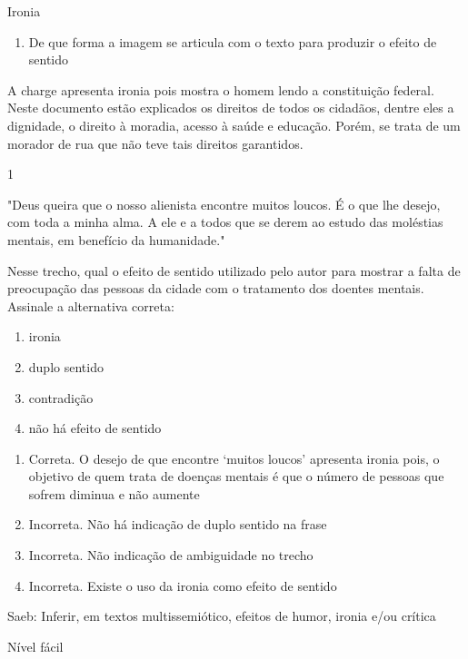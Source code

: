 {Ironia

\begin{enumerate}
\def\labelenumi{\arabic{enumi})}
\setcounter{enumi}{9}
\tightlist
\item
  De que forma a imagem se articula com o texto para produzir o efeito
  de sentido
\end{enumerate}

A charge apresenta ironia pois mostra o homem lendo a constituição
federal. Neste documento estão explicados os direitos de todos os
cidadãos, dentre eles a dignidade, o direito à moradia, acesso à saúde e
educação. Porém, se trata de um morador de rua que não teve tais
direitos garantidos.


\num{1}

"Deus queira que o nosso alienista encontre muitos loucos. É o que lhe
desejo, com toda a minha alma. A ele e a todos que se derem ao estudo
das moléstias mentais, em benefício da humanidade."

Nesse trecho, qual o efeito de sentido utilizado pelo autor para mostrar
a falta de preocupação das pessoas da cidade com o tratamento dos
doentes mentais. Assinale a alternativa correta:

\begin{enumerate}
\def\labelenumi{\alph{enumi})}
\item
  ironia
\item
  duplo sentido
\item
  contradição
\item
  não há efeito de sentido
\end{enumerate}

\begin{enumerate}
\def\labelenumi{\alph{enumi})}
\item
  Correta. O desejo de que encontre `muitos loucos' apresenta ironia
  pois, o objetivo de quem trata de doenças mentais é que o número de
  pessoas que sofrem diminua e não aumente
\item
  Incorreta. Não há indicação de duplo sentido na frase
\item
  Incorreta. Não indicação de ambiguidade no trecho
\item
  Incorreta. Existe o uso da ironia como efeito de sentido
\end{enumerate}

Saeb: Inferir, em textos multissemiótico, efeitos de humor, ironia e/ou
crítica

Nível fácil

}
